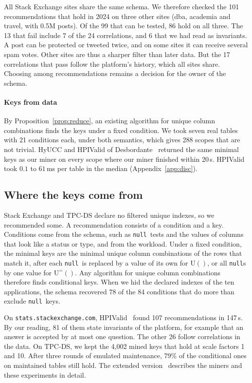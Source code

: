 \documentclass[conference]{IEEEtran}
\theoremstyle{definition}
\newcommand{\sql}[1]{\texttt{#1}}
\newcommand{\nul}{\texttt{null}}
\newcommand{\U}[1]{\mathrm{U}(#1)}
\newcommand{\Ueq}[1]{\mathrm{U}^{=}(#1)}
\begin{document}
All Stack Exchange sites share the same schema. We therefore checked the 101 recommendations that hold in 2024 on three
other sites (dba, academia and travel, with 0.5M posts). Of the 99 that can be tested, 86 hold on all three. The 13 that
fail include 7 of the 24 correlations, and 6 that we had read as invariants. A post can be protected or tweeted twice,
and on some sites it can receive several spam votes. Other sites are thus a sharper filter than later data. But the 17
correlations that pass follow the platform's history, which all sites share. Choosing among recommendations remains a
decision for the owner of the schema.

\paragraph*{Keys from data} By Proposition~\ref{prop:reduce}, an existing algorithm for unique column combinations
finds the keys under a fixed condition. We took seven real tables with 21 conditions each, under both semantics, which
gives 288 scopes that are not trivial. HyUCC and HPIValid of Desbordante~\cite{Desb} returned the same minimal keys as our
miner on every scope where our miner finished within 20\,s. HPIValid took $0.1$ to $61$\,ms per table in the median
(Appendix~\ref{app:disc}).
\else
\subsection{Where the keys come from}\label{sec:exp-rec}\label{sec:discovery}

Stack Exchange and TPC-DS declare no filtered unique indexes, so we recommended some. A recommendation consists of a
condition and a key. Conditions come from the schema, such as \nul\ tests and the values of columns that look like a
status or type, and from the workload. Under a fixed condition, the minimal keys are the minimal unique column
combinations of the rows that match it, after each \nul\ is replaced by a value of its own for $\U{}$, or all \nul s by
one value for $\Ueq{}$. Any algorithm for unique column combinations~\cite{PN17,BBFNPS20} therefore finds conditional keys. When
we hid the declared indexes of the ten applications, the schema recovered 78 of the 84 conditions that do more than
exclude \nul\ keys.

On \sql{stats.stackexchange.com}, HPIValid~\cite{Desb} found 107 recommendations in 147\,s. By our reading, 81 of them
state invariants of the platform, for example that an answer is accepted by at most one question. The other 26 follow
correlations in the data. On TPC-DS, we kept the 4{,}002 mined keys that hold at scale factors 1 and 10. After three
rounds of emulated maintenance, 79\% of the conditional ones on maintained tables still hold. The extended
version~\cite{EXT} describes the miners and these experiments in detail.
\fi
\end{document}
